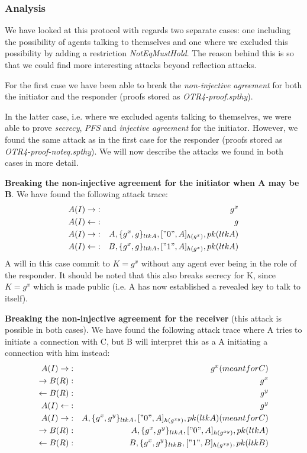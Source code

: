 \documentclass[a4paper]{article}
\begin{document}
\subsubsection*{Analysis}
We have looked at this protocol with regards two separate cases: one including the possibility of agents talking to themselves and one where we excluded this possibility by adding a restriction {\em NotEqMustHold}. The reason behind this is so that we could find more interesting attacks beyond reflection attacks. \par
For the first case we have been able to break the {\em non-injective agreement} for both the initiator and the responder (proofs stored as {\em OTR4-proof.spthy}). \par 
In the latter case, i.e. where we excluded agents talking to themselves, we were able to prove {\em secrecy}, {\em PFS} and {\em injective agreement} for the initiator. However, we found the same attack as in the first case for the responder (proofs stored as {\em OTR4-proof-noteq.spthy}). We will now describe the attacks we found in both cases in more detail.\par
{\bf Breaking the non-injective agreement for the initiator when A may be B}. We have found the following attack trace:
\begin{eqnarray*}
A(I) \to            & : & {g^x}\\
A(I) \leftarrow & : & {g}\\
A(I) \to            & : & A, \{{g^x}, {g}\}_{ltkA}, ["0", A]_{h(g^x)}, {pk(ltkA)}\\
A(I) \leftarrow & : & B, \{{g^x}, {g}\}_{ltkA}, ["1", A]_{h(g^x)}, {pk(ltkA)}
\end{eqnarray*}
A will in this case commit to ${K=g^x}$ without any agent ever being in the role of the responder. It should be noted that this also breaks secrecy for {K}, since ${K=g^x}$ which is made public (i.e. A has now established a revealed key to talk to itself). \par
{\bf Breaking the non-injective agreement for the receiver} (this attack is possible in both cases). We have found the following attack trace where A tries to initiate a connection with C, but B will interpret this as a A initiating a connection with him instead:
\begin{eqnarray*}
A(I) \to            & : & {g^x} (meant for C)\\
       \to            B(R) & : & {g^x}\\
       \leftarrow B(R) & : & {g^y}\\
A(I) \leftarrow          & : & {g^y}\\
A(I) \to                     & : & A, \{{g^x}, {g^y}\}_{ltkA}, ["0", A]_{h(g^{xy})}, {pk(ltkA)} (meant for C)\\
       \to            B(R) & : & A, \{{g^x}, {g^y}\}_{ltkA}, ["0", A]_{h(g^{xy})}, {pk(ltkA)}\\
       \leftarrow B(R) & : & B, \{{g^x}, {g^y}\}_{ltkB}, ["1", B]_{h(g^{xy})}, {pk(ltkB)}
\end{eqnarray*}
\end{document}
